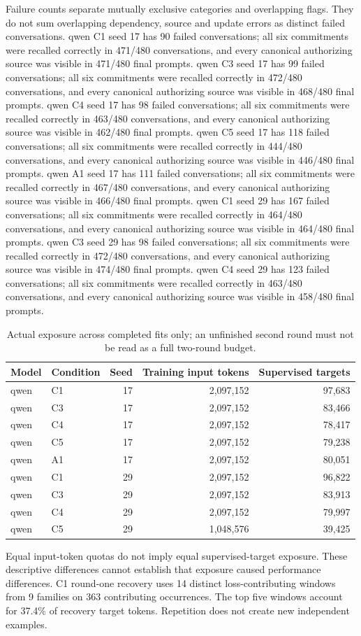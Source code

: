 Failure counts separate mutually exclusive categories and overlapping flags. They do not sum overlapping dependency, source and update errors as distinct failed conversations.
qwen C1 seed 17 has 90 failed conversations; all six commitments were recalled correctly in 471/480 conversations, and every canonical authorizing source was visible in 471/480 final prompts.
qwen C3 seed 17 has 99 failed conversations; all six commitments were recalled correctly in 472/480 conversations, and every canonical authorizing source was visible in 468/480 final prompts.
qwen C4 seed 17 has 98 failed conversations; all six commitments were recalled correctly in 463/480 conversations, and every canonical authorizing source was visible in 462/480 final prompts.
qwen C5 seed 17 has 118 failed conversations; all six commitments were recalled correctly in 444/480 conversations, and every canonical authorizing source was visible in 446/480 final prompts.
qwen A1 seed 17 has 111 failed conversations; all six commitments were recalled correctly in 467/480 conversations, and every canonical authorizing source was visible in 466/480 final prompts.
qwen C1 seed 29 has 167 failed conversations; all six commitments were recalled correctly in 464/480 conversations, and every canonical authorizing source was visible in 464/480 final prompts.
qwen C3 seed 29 has 98 failed conversations; all six commitments were recalled correctly in 472/480 conversations, and every canonical authorizing source was visible in 474/480 final prompts.
qwen C4 seed 29 has 123 failed conversations; all six commitments were recalled correctly in 463/480 conversations, and every canonical authorizing source was visible in 458/480 final prompts.
\begin{table}[ht]\centering\caption{Actual exposure across completed fits only; an unfinished second round must not be read as a full two-round budget.}\begin{tabular}{llrrr}\toprule Model & Condition & Seed & Training input tokens & Supervised targets\\\midrule
qwen & C1 & 17 & 2,097,152 & 97,683\\
qwen & C3 & 17 & 2,097,152 & 83,466\\
qwen & C4 & 17 & 2,097,152 & 78,417\\
qwen & C5 & 17 & 2,097,152 & 79,238\\
qwen & A1 & 17 & 2,097,152 & 80,051\\
qwen & C1 & 29 & 2,097,152 & 96,822\\
qwen & C3 & 29 & 2,097,152 & 83,913\\
qwen & C4 & 29 & 2,097,152 & 79,997\\
qwen & C5 & 29 & 1,048,576 & 39,425\\
\bottomrule\end{tabular}\end{table}
Equal input-token quotas do not imply equal supervised-target exposure. These descriptive differences cannot establish that exposure caused performance differences.
C1 round-one recovery uses 14 distinct loss-contributing windows from 9 families on 363 contributing occurrences. The top five windows account for 37.4\% of recovery target tokens. Repetition does not create new independent examples.
